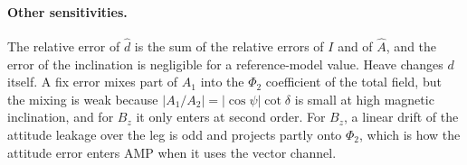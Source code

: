 \paragraph{Other sensitivities.}
The relative error of $\hat{d}$ is the sum of the relative errors of $I$ and of $\hat{A}$, and the error of the inclination is negligible for a reference-model value. Heave changes $d$ itself. A fix error mixes part of $A_1$ into the $\Phi_2$ coefficient of the total field, but the mixing is weak because $|A_1/A_2| = |\cos\psi|\cot\delta$ is small at high magnetic inclination, and for $B_z$ it only enters at second order. For $B_z$, a linear drift of the attitude leakage over the leg is odd and projects partly onto $\Phi_2$, which is how the attitude error enters AMP when it uses the vector channel.
